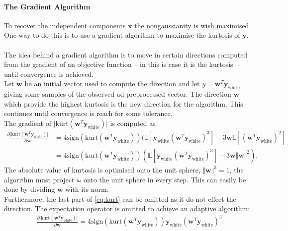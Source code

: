\paragraph{The Gradient Algorithm}
To recover the independent components $\mathbf{x}$ the nongaussianity is wish maximised. One way to do this is to use a gradient algorithm to maximise the kurtosis of $\mathbf{y}$.
\\ \\
The idea behind a gradient algorithm is to move in certain directions computed from the gradient of an objective function -- in this is case it is the kurtosis -- until convergence is achieved.
\\
Let $\mathbf{w}$ be an initial vector used to compute the direction and let $y = \mathbf{w}^T \mathbf{y}_{\text{white}}$ giving some samples of the observed ad preprocessed vector. The direction $\mathbf{w}$ which provide the highest kurtosis is the new direction for the algorithm. This continues until convergence is reach for some tolerance.
\\
The gradient of $\vert \text{kurt}(\mathbf{w}^T \mathbf{y}_{\text{white}}) \vert$ is computed as
\begin{align}\label{eq:kurt}
\frac{\partial \vert \text{kurt}(\mathbf{w}^T \mathbf{y}_{\text{white}})\vert}{\partial \mathbf{w}} &= 4 \text{sign}(\text{kurt}(\mathbf{w}^T \mathbf{y}_{\text{white}})) (\mathbb{E}[\mathbf{y}_{\text{white}} (\mathbf{w}^T \mathbf{y}_{\text{white}})^3] - 3 \mathbf{w} \mathbb{E}[(\mathbf{w}^T \mathbf{y}_{\text{white}})^2] \nonumber \\
&= 4 \text{sign}(\text{kurt}(\mathbf{w}^T \mathbf{y}_{\text{white}})) (\mathbb{E}[\mathbf{y}_{\text{white}} (\mathbf{w}^T \mathbf{y}_{\text{white}})^3] - 3 \mathbf{w} \Vert \mathbf{w} \Vert^2).
\end{align}
The absolute value of kurtosis is optimised onto the unit sphere, $\Vert \mathbf{w} \Vert^2 = 1$, the algorithm must project $\mathbb{w}$ onto the unit sphere in every step. This can easily be done by dividing $\mathbf{w}$ with its norm. 
\\
Furthermore, the last part of \eqref{eq:kurt} can be omitted as it do not effect the direction. The expectation operator is omitted to achieve an adaptive algorithm:
\begin{align*}
\frac{\partial \vert \text{kurt}(\mathbf{w}^T \mathbf{y}_{\text{white}})\vert}{\partial \mathbf{w}} = 4 \text{sign}(\text{kurt}(\mathbf{w}^T \mathbf{y}_{\text{white}})) \mathbf{y}_{\text{white}} (\mathbf{w}^T \mathbf{y}_{\text{white}})^3
\end{align*}
